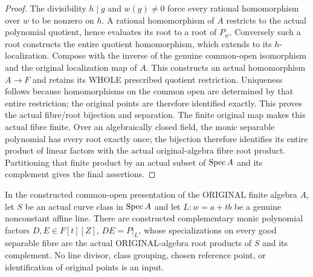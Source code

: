 \begin{proof}
The divisibility $h\mid g$ and $w(g)\ne0$ force every rational homomorphism over $w$ to be nonzero on $h$.
A rational homomorphism of $A$ restricts to the actual polynomial quotient, hence evaluates its root to a root
of $P_w$. Conversely such a root constructs the entire quotient homomorphism, which extends to its $h$-localization.
Compose with the inverse of the genuine common-open isomorphism and the original localization map of $A$.
This constructs an actual homomorphism $A\to F$ and retains its WHOLE prescribed quotient restriction.
Uniqueness follows because homomorphisms on the common open are determined by that entire restriction;
the original points are therefore identified exactly. This proves the actual fibre/root bijection and separation.
The finite original map makes this actual fibre finite. Over an algebraically closed field, the monic separable
polynomial has every root exactly once; the bijection therefore identifies its entire product of linear factors
with the actual original-algebra fibre root product. Partitioning that finite product by an actual subset of
$\operatorname{Spec} A$ and its complement gives the final assertions.
\end{proof}

\begin{lemma}\label{lem:fc-original-line-factors}
\leanok
{}
In the constructed common-open presentation of the ORIGINAL finite algebra $A$, let $S$ be an actual curve
class in $\operatorname{Spec} A$ and let $L\colon w=a+tb$ be a genuine nonconstant affine line.
There are constructed complementary monic polynomial factors $D,E\in F[t][Z]$, $DE=P|_L$, whose
specializations on every good separable fibre are the actual ORIGINAL-algebra root products of $S$ and its complement.
No line divisor, class grouping, chosen reference point, or identification of original points is an input.
\end{lemma}

